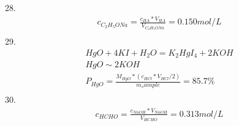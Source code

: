 \documentclass{article}
\begin{document}
28.\begin{equation}
    \begin{multlined}
        c_{C_2H_5ONa} = \frac{c_{HA}*V_{HA}}{V_{C_2H_5ONa}} = 0.150 mol/L\\
    \end{multlined}
\end{equation}
29.\begin{equation}
    \begin{multlined}
        HgO+4KI+H_2O=K_2HgI_4+2KOH\\
        HgO \sim 2KOH\\
        P_{HgO} = \frac{M_{HgO}*(c_{HCl}*V_{HCl} / 2)}{m_sample} = 85.7\%\\
    \end{multlined}
\end{equation}
30.\begin{equation}
    \begin{multlined}
        c_{HCHO} = \frac{c_{NaOH}*V_{NaOH}}{V_{HCHO}} = 0.313 mol/L\\
    \end{multlined}
\end{equation}
\end{document}
